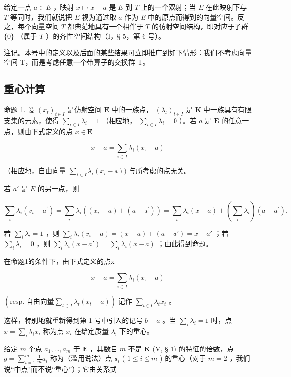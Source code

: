 给定一点 \(a \in E\) ，映射 \(x \mapsto x - a\) 是 \(E\) 到 \(T\) 上的一个双射；当 \(E\) 在此映射下与 \(T\) 等同时，我们就说把 \(E\) 视为通过取 \(a\) 作为 \(E\) 中的原点而得到的向量空间。反之，每个向量空间 \(T\) 都典范地具有一个相伴于 \(T\) 的仿射空间结构，即对应于子群 \(\{0\}\) （属于 \(T\) ）的齐性空间结构（I，§ 5，第 6 号）。

注记。本号中的定义以及后面的某些结果可立即推广到如下情形：我们不考虑向量空间 T，而是考虑任意一个带算子的交换群 T。

\subsection{重心计算}

命题 1. 设 \((x_{t})_{t\in I}\) 是仿射空间 \(\mathbf{E}\) 中的一族点， \((\lambda_t)_{t\in I}\) 是 \(\mathbf{K}\) 中一族具有有限支集的元素，使得 \(\sum_{i\in I}\lambda_i = 1\) （相应地， \(\sum_{i\in I}\lambda_i = 0\) ）。若 \(a\) 是 \(\mathbf{E}\) 的任意一点，则由下式定义的点 \(x\in \mathbf{E}\)

\[
x - a = \sum_ {i \in I} \lambda_ {i} (x _ {i} - a)
\]

（相应地，自由向量 \(\sum_{i\in I}\lambda_i(x_i - a))\) 与所考虑的点无关。

若 \(a'\) 是 \(E\) 的另一点，则

\[
\sum_ {i} \lambda_ {i} (x _ {i} - a ^ {\prime}) = \sum_ {i} \lambda_ {i} ((x _ {i} - a) + (a - a ^ {\prime})) = \sum_ {i} \lambda_ {i} (x - a) + \left(\sum_ {i} \lambda_ {i}\right) (a - a ^ {\prime}).
\]

若 \(\sum_{i}\lambda_{i} = 1\) ，则 \(\sum_{i}\lambda_{i}(x_{i} - a) = (x - a) + (a - a') = x - a'\) ；若 \(\sum_{i}\lambda_{i} = 0\) ，则 \(\sum_{i}\lambda_{i}(x - a') = \sum_{i}\lambda_{i}(x - a)\) ；由此得到命题。

在命题1的条件下，由下式定义的点x

\[
x - a = \sum_ {i \in I} \lambda_ {i} (x _ {i} - a)
\]

\(\left(\text{resp. 自由向量} \sum_{t \in I} \lambda_t(x_t - a)\right)\) 记作 \(\sum_{t \in I} \lambda_t x_t\) 。

这样，特别地就重新得到第 1 号中引入的记号 \(b - a\) 。当 \(\sum_{i} \lambda_{i} = 1\) 时，点 \(x = \sum_{i} \lambda_{i} x_{i}\) 称为点 \(x_{i}\) 在给定质量 \(\lambda_{i}\) 下的重心。

给定 \(m\) 个点 \(a_1, \ldots, a_m\) 于 \(\mathbf{E}\) ，其数目 \(m\) 不是 \(\mathbf{K}\) (V, § 1) 的特征的倍数，点 \(g = \sum_{i=1}^{m} \frac{1}{m} a_i\) 称为（滥用说法）点 \(a_i\) ( \(1 \leqslant i \leqslant m\) ) 的重心（对于 \(m = 2\) ，我们说“中点”而不说“重心”）；它由关系式

